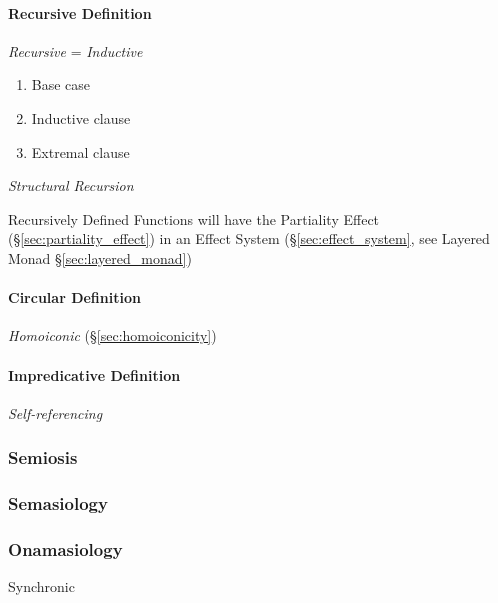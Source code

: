 \paragraph{Recursive Definition}\label{sec:recursive_definition}\hfill

\emph{Recursive} = \emph{Inductive}

\begin{enumerate}
    \item Base case
    \item Inductive clause
    \item Extremal clause
\end{enumerate}

\emph{Structural Recursion}

Recursively Defined Functions will have the Partiality Effect
(\S\ref{sec:partiality_effect}) in an Effect System
(\S\ref{sec:effect_system}, see Layered Monad
\S\ref{sec:layered_monad})



\paragraph{Circular Definition}\label{sec:circular_definition}\hfill

\emph{Homoiconic} (\S\ref{sec:homoiconicity})



\paragraph{Impredicative Definition}\label{sec:impredicative_definition}\hfill

\emph{Self-referencing}



\subsubsection{Semiosis}\label{sec:semiosis}

\subsubsection{Semasiology}\label{sec:semasiology}

\subsubsection{Onamasiology}\label{sec:onamasiology}

Synchronic


